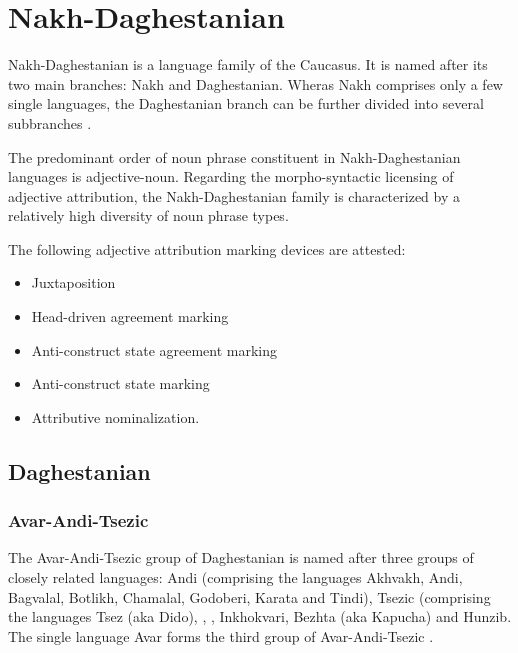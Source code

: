 \section{Nakh-Daghestanian}
Nakh-Daghestanian is a language family of the Caucasus. It is named after its two main branches: Nakh and Daghestanian. Wheras Nakh comprises only a few single languages, the Daghestanian branch can be further divided into several subbranches \cite[220, 233]{salminen2007}.

The predominant order of noun phrase constituent in Nakh-Daghestanian languages is adjective-noun. Regarding the morpho-syntactic licensing of adjective attribution, the Nakh-Daghestanian family is characterized by a relatively high diversity of noun phrase types.

The following adjective attribution marking devices are attested:
\begin{itemize}
\item Juxtaposition
\item Head-driven agreement marking
\item Anti-construct state agreement marking
\item Anti-construct state marking
\item Attributive nominalization.
\end{itemize}

\subsection{Daghestanian}
\subsubsection{Avar-Andi-Tsezic}
The Avar-Andi-Tsezic group of Daghestanian is named after three groups of closely related languages: Andi (comprising the languages Akhvakh, Andi, Bagvalal, Botlikh, Chamalal, Godoberi, Karata and Tindi), Tsezic (comprising the languages Tsez (aka Dido), , , Inkhokvari, Bezhta (aka Kapucha) and Hunzib. The single language Avar forms the third group of Avar-Andi-Tsezic \citep[220, 233]{salminen2007}.

